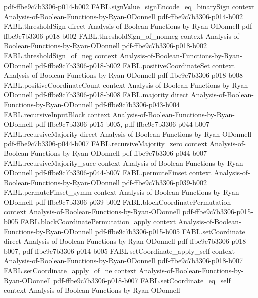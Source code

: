 \begin{theorem}
  {pdf-ffbe9c7b3306-p014-b002}
\proofstep
  {FABL.signValue_signEncode_eq_binarySign}
  {context}
  {Analysis-of-Boolean-Functions-by-Ryan-ODonnell}
  {pdf-ffbe9c7b3306-p014-b002}
\proofstep
  {FABL.thresholdSign}
  {direct}
  {Analysis-of-Boolean-Functions-by-Ryan-ODonnell}
  {pdf-ffbe9c7b3306-p018-b002}
\proofstep
  {FABL.thresholdSign_of_nonneg}
  {context}
  {Analysis-of-Boolean-Functions-by-Ryan-ODonnell}
  {pdf-ffbe9c7b3306-p018-b002}
\proofstep
  {FABL.thresholdSign_of_neg}
  {context}
  {Analysis-of-Boolean-Functions-by-Ryan-ODonnell}
  {pdf-ffbe9c7b3306-p018-b002}
\proofstep
  {FABL.positiveCoordinateSet}
  {context}
  {Analysis-of-Boolean-Functions-by-Ryan-ODonnell}
  {pdf-ffbe9c7b3306-p018-b008}
\proofstep
  {FABL.positiveCoordinateCount}
  {context}
  {Analysis-of-Boolean-Functions-by-Ryan-ODonnell}
  {pdf-ffbe9c7b3306-p018-b008}
\proofstep
  {FABL.majority}
  {direct}
  {Analysis-of-Boolean-Functions-by-Ryan-ODonnell}
  {pdf-ffbe9c7b3306-p043-b004}
\proofstep
  {FABL.recursiveInputBlock}
  {context}
  {Analysis-of-Boolean-Functions-by-Ryan-ODonnell}
  {pdf-ffbe9c7b3306-p015-b005,
    pdf-ffbe9c7b3306-p044-b007}
\proofstep
  {FABL.recursiveMajority}
  {direct}
  {Analysis-of-Boolean-Functions-by-Ryan-ODonnell}
  {pdf-ffbe9c7b3306-p044-b007}
\proofstep
  {FABL.recursiveMajority_zero}
  {context}
  {Analysis-of-Boolean-Functions-by-Ryan-ODonnell}
  {pdf-ffbe9c7b3306-p044-b007}
\proofstep
  {FABL.recursiveMajority_succ}
  {context}
  {Analysis-of-Boolean-Functions-by-Ryan-ODonnell}
  {pdf-ffbe9c7b3306-p044-b007}
\proofstep
  {FABL.permuteFinset}
  {context}
  {Analysis-of-Boolean-Functions-by-Ryan-ODonnell}
  {pdf-ffbe9c7b3306-p039-b002}
\proofstep
  {FABL.permuteFinset_symm}
  {context}
  {Analysis-of-Boolean-Functions-by-Ryan-ODonnell}
  {pdf-ffbe9c7b3306-p039-b002}
\proofstep
  {FABL.blockCoordinatePermutation}
  {context}
  {Analysis-of-Boolean-Functions-by-Ryan-ODonnell}
  {pdf-ffbe9c7b3306-p015-b005}
\proofstep
  {FABL.blockCoordinatePermutation_apply}
  {context}
  {Analysis-of-Boolean-Functions-by-Ryan-ODonnell}
  {pdf-ffbe9c7b3306-p015-b005}
\proofstep
  {FABL.setCoordinate}
  {direct}
  {Analysis-of-Boolean-Functions-by-Ryan-ODonnell}
  {pdf-ffbe9c7b3306-p018-b007,
    pdf-ffbe9c7b3306-p014-b005}
\proofstep
  {FABL.setCoordinate_apply_self}
  {context}
  {Analysis-of-Boolean-Functions-by-Ryan-ODonnell}
  {pdf-ffbe9c7b3306-p018-b007}
\proofstep
  {FABL.setCoordinate_apply_of_ne}
  {context}
  {Analysis-of-Boolean-Functions-by-Ryan-ODonnell}
  {pdf-ffbe9c7b3306-p018-b007}
\proofstep
  {FABL.setCoordinate_eq_self}
  {context}
  {Analysis-of-Boolean-Functions-by-Ryan-ODonnell}

\end{theorem}
